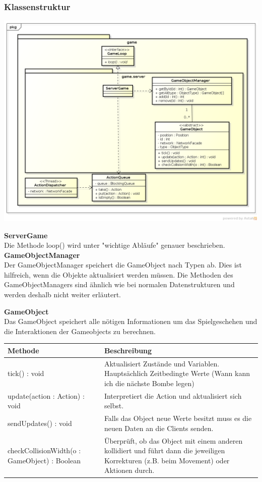 \documentclass[11pt]{scrartcl}
\begin{document}
\subsubsection{Klassenstruktur}
\includegraphics[scale=0.5]{ClassDiagramGameServer}

\textbf{ServerGame}\\
Die Methode loop() wird unter "wichtige Abläufe" genauer beschrieben.\\

\textbf{GameObjectManager}\\
Der GameObjectManager speichert die GameObject nach Typen ab. Dies ist hilfreich, wenn die Objekte aktualisiert werden müssen. Die Methoden des GameObjectManagers sind ähnlich wie bei normalen Datenstrukturen und werden deshalb nicht weiter erläutert.\\

\newpage

\textbf{GameObject}\\
Das GameObject speichert alle nötigen Informationen um das Spielgeschehen und die Interaktionen der Gameobjects zu berechnen.\\


\begin{tabularx}{\linewidth}{l p{6cm}}
\textbf{Methode} & \textbf{Beschreibung}\\
\hline
tick() : void & Aktualisiert Zustände und Variablen. Hauptsächlich Zeitbedingte Werte (Wann kann ich die nächste Bombe legen)\\
update(action : Action) : void & Interpretiert die Action und aktualisiert sich selbst.\\
sendUpdates() : void & Falls das Object neue Werte besitzt muss es die neuen Daten an die Clients senden.\\
checkCollisionWidth(o : GameObject) : Boolean & Überprüft, ob das Object mit einem anderen kollidiert und führt dann die jeweiligen Korrekturen (z.B. beim Movement) oder Aktionen durch.\\

\end{tabularx}
\end{document}
